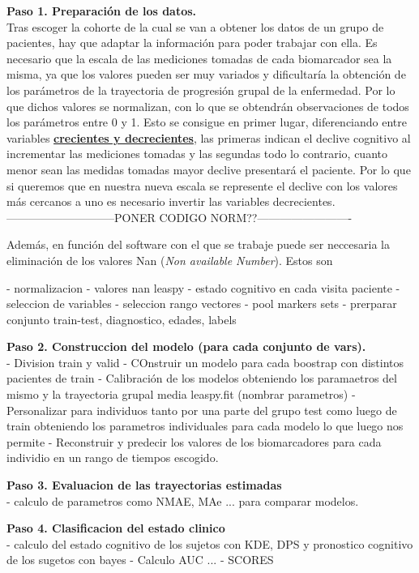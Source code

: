 \documentclass[12pt]{article}
\begin{document}
\begin{description}
	\item {\textbf{Paso 1. Preparación de los datos.}}\\
	Tras escoger la cohorte de la cual se van a obtener los datos de un grupo de pacientes, hay que adaptar la información para poder trabajar con ella. Es necesario que la escala de las mediciones tomadas de cada biomarcador sea la misma, ya que los valores pueden ser muy variados y dificultaría la obtención de los parámetros de la trayectoria de progresión grupal de la enfermedad. Por lo que dichos valores se normalizan, con lo que se obtendrán observaciones de todos los parámetros entre 0 y 1. Esto se consigue en primer lugar, diferenciando entre variables \textbf{\underline{crecientes y decrecientes}}, las primeras indican el declive cognitivo al incrementar las mediciones tomadas y las segundas todo lo contrario, cuanto menor sean las medidas tomadas mayor declive presentará el paciente. Por lo que si queremos que en nuestra nueva escala se represente el declive con los valores más cercanos a uno es necesario invertir las variables decrecientes.\\
	
	-----------------------------PONER CODIGO NORM??-------------------------
	
	Además, en función del software con el que se trabaje puede ser neccesaria la eliminación de los valores Nan (\textit{Non available Number}). Estos son 
	
	
	
	
	
	
	
	
	
	- normalizacion
	- valores nan leaspy
	- estado cognitivo en cada visita paciente
	- seleccion de variables
	- seleccion rango vectores
	- pool markers sets
	- prerparar conjunto train-test, diagnostico, edades, labels
	
	\item {\textbf{Paso 2. Construccion del modelo (para cada conjunto de vars).}}\\
	- Division train y valid
	- COnstruir un modelo para cada boostrap con distintos pacientes de train
	- Calibración de los modelos obteniendo los paramaetros del mismo y la trayectoria grupal media leaspy.fit (nombrar parametros)
	- Personalizar para individuos tanto por una parte del grupo test como luego de train obteniendo los parametros individuales para cada modelo lo que luego nos permite 
	- Reconstruir y predecir los valores de los biomarcadores para cada individio en un rango de tiempos escogido.
	
	\item {\textbf{Paso 3. Evaluacion de las trayectorias estimadas}}\\
	- calculo de parametros como NMAE, MAe ... para comparar modelos.
	
	\item {\textbf{Paso 4. Clasificacion del estado clinico}}\\
	- calculo del estado cognitivo de los sujetos con KDE, DPS y pronostico cognitivo de los sugetos con bayes
	- Calculo AUC ... 
	- SCORES
	
\end{description}
\end{document}
